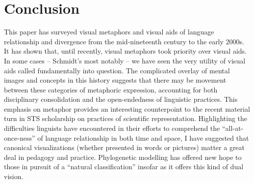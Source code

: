 \documentclass[output=paper]{langscibook}
\begin{document}
\section{Conclusion}
\label{sec:kaplan:conc}

This paper has surveyed visual metaphors and visual aids of language relationship and divergence from the mid-nineteenth century to the early 2000s. It has shown that, until recently, visual metaphors took priority over visual aids. In some cases -- Schmidt's most notably -- we have seen the very utility of visual aids called fundamentally into question. The complicated overlay of mental images and concepts in this history suggests that there may be movement between these categories of metaphoric expression, accounting for both disciplinary consolidation and the open-endedness of linguistic practices. This emphasis on metaphor provides an interesting counterpoint to the recent material turn in STS scholarship on practices of scientific representation. Highlighting the difficulties linguists have encountered in their efforts to comprehend the ``all-at-once-ness'' of language relationship in both time and space, I have suggested that canonical visualizations (whether presented in words or pictures) matter a great deal in pedagogy and practice. Phylogenetic modelling has offered new hope to those in pursuit of a ``natural classification'' insofar as it offers this kind of dual vision.

\sloppy
\printbibliography[heading=subbibliography,notkeyword=this]
\end{document}
